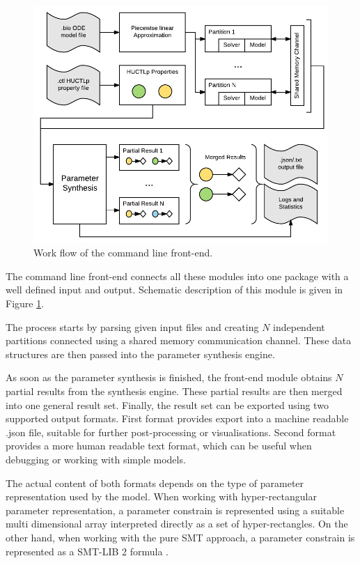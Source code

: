 \begin{figure}[]
	\centering
	\includegraphics[scale=0.9]{media/cli_workflow.pdf}
	\caption{Work flow of the command line front-end. }
	\label{fig:cli_workflow}
\end{figure}

The command line front-end connects all these modules into one package with a well defined input and output. Schematic description of this module is given in Figure \ref{fig:cli_workflow}.

The process starts by parsing given input files and creating $N$ independent partitions connected using a shared memory communication channel. These data structures are then passed into the parameter synthesis engine.

As soon as the parameter synthesis is finished, the front-end module obtains $N$ partial results from the synthesis engine. These partial results are then merged into one general result set. Finally, the result set can be exported using two supported output formats. First format provides export into a machine readable .json file, suitable for further post-processing or visualisations. Second format provides a more human readable text format, which can be useful when debugging or working with simple models.

The actual content of both formats depends on the type of parameter representation used by the model. When working with hyper-rectangular parameter representation, a parameter constrain is represented using a suitable multi dimensional array interpreted directly as a set of hyper-rectangles. On the other hand, when working with the pure SMT approach, a parameter constrain is represented as a SMT-LIB 2 formula \cite{smtlib}.

